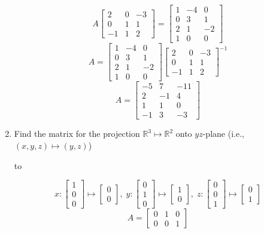 \documentclass[11pt]{article}
\newcommand{\hdotrule}[1]{\hbox to \textwidth{\leaders\hbox to #1pt{\hss . \hss}\hfil}}
\begin{document}
\begin{preview}
\begin{enumerate}
                  
            $$A \begin{bmatrix}2&0&-3\\0&1&1\\-1&1&2\end{bmatrix} = \begin{bmatrix}1&-4&0\\0&3&1\\2&1&-2\\1&0&0\end{bmatrix}$$
            $$A = \begin{bmatrix}1&-4&0\\0&3&1\\2&1&-2\\1&0&0\end{bmatrix}\begin{bmatrix}2&0&-3\\0&1&1\\-1&1&2\end{bmatrix}^{-1}$$
            $$A=\begin{bmatrix}-5&7&-11\\ 2&-1&4\\ 1&1&0\\ -1&3&-3\end{bmatrix}$$

            \item Find the matrix for the projection $\mathbb{R}^3 \mapsto \mathbb{R}^2$ onto $yz$-plane (i.e., $(x,y,z) \mapsto (y,z)$)
            
            \hdotrule{5}

                  $$
                        x: \begin{bmatrix}1\\0\\0\end{bmatrix} \mapsto \begin{bmatrix}0\\0\end{bmatrix}, \; 
                        y: \begin{bmatrix}0\\1\\0\end{bmatrix} \mapsto \begin{bmatrix}1\\0\end{bmatrix}, \; 
                        z: \begin{bmatrix}0\\0\\1\end{bmatrix} \mapsto \begin{bmatrix}0\\1\end{bmatrix}
                  $$
                  $$A = \begin{bmatrix}0&1&0\\0&0&1\end{bmatrix}$$ 
            

\end{enumerate}
\end{preview}
\end{document}
